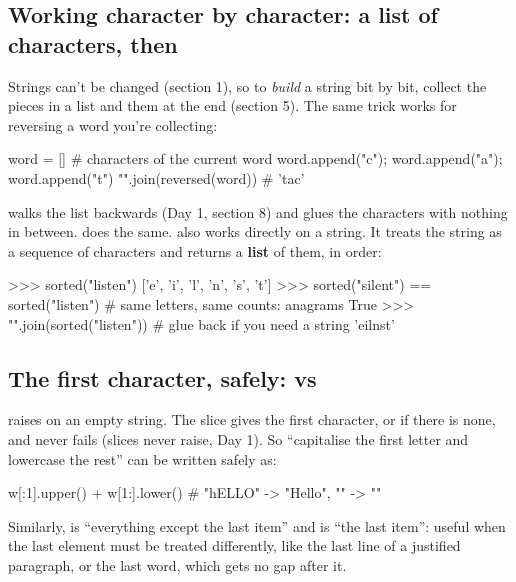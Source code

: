 \documentclass[10pt,a4paper]{article}
\begin{document}
\subsection{Working character by character: a list of characters, then }
Strings can’t be changed (section 1), so to \emph{build} a string bit by bit, collect the pieces in a list and  them at the end (section 5). The same trick works for reversing a word you’re collecting:
\begin{pycode}
word = []                  # characters of the current word
word.append("c"); word.append("a"); word.append("t")
"".join(reversed(word))    # 'tac'
\end{pycode}
 walks the list backwards (Day 1, section 8) and  glues the characters with nothing in between.  does the same.
 also works directly on a string. It treats the string as a sequence of characters and returns a \textbf{list} of them, in order:
\begin{txtcode}
>>> sorted("listen")
['e', 'i', 'l', 'n', 's', 't']
>>> sorted("silent") == sorted("listen")      # same letters, same counts: anagrams
True
>>> "".join(sorted("listen"))                 # glue back if you need a string
'eilnst'
\end{txtcode}
\subsection{The first character, safely:  vs }
 raises  on an empty string. The slice  gives the first character, or \code{\textquotedbl{}\textquotedbl{}} if there is none, and never fails (slices never raise, Day 1). So “capitalise the first letter and lowercase the rest” can be written safely as:
\begin{pycode}
w[:1].upper() + w[1:].lower()      # "hELLO" -> "Hello", "" -> ""
\end{pycode}
Similarly,  is “everything except the last item” and  is “the last item”: useful when the last element must be treated differently, like the last line of a justified paragraph, or the last word, which gets no gap after it.
\end{document}
